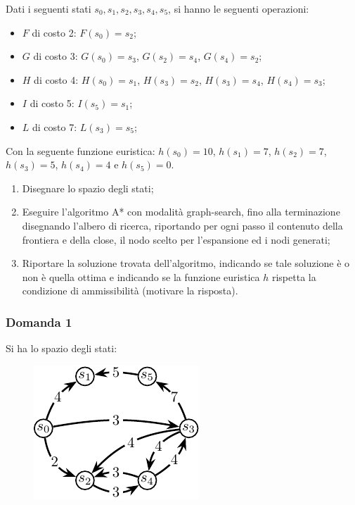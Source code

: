 \documentclass{article}
\numberwithin{equation}{section}
\begin{document}
Dati i seguenti stati $s_0, s_1,s_2,s_3,s_4,s_5$, si hanno le seguenti operazioni:
\begin{itemize}
    \item $F$ di costo 2: $F(s_0)=s_2$;
    \item $G$ di costo 3: $G(s_0)=s_3$, $G(s_2)=s_4$, $G(s_4)=s_2$;
    \item $H$ di costo 4: $H(s_0)=s_1$, $H(s_3)=s_2$, $H(s_3)=s_4$, $H(s_4)=s_3$;
    \item $I$ di costo 5: $I(s_5)=s_1$;
    \item $L$ di costo 7: $L(s_3)=s_5$;
\end{itemize}

Con la seguente funzione euristica: $h(s_0)=10$, $h(s_1)=7$, $h(s_2)=7$, $h(s_3)=5$, $h(s_4)=4$ e $h(s_5)=0$. 

\begin{enumerate}
    \item Disegnare lo spazio degli stati;
    \item Eseguire l'algoritmo A* con modalità graph-search, fino alla terminazione disegnando l'albero di ricerca, riportando per ogni passo il 
contenuto della frontiera e della close, il nodo scelto per l'espansione ed i nodi generati;
    \item Riportare la soluzione trovata dell'algoritmo, indicando se tale soluzione è o non è quella ottima e indicando se la funzione euristica 
$h$ rispetta la condizione di ammissibilità (motivare la risposta). 
\end{enumerate}

\subsubsection*{Domanda 1}

Si ha lo spazio degli stati:
\begin{figure}[H]%
    \centering%
    \includegraphics{spazio_stati_25-11-24.pdf}%
\end{figure}
\end{document}
